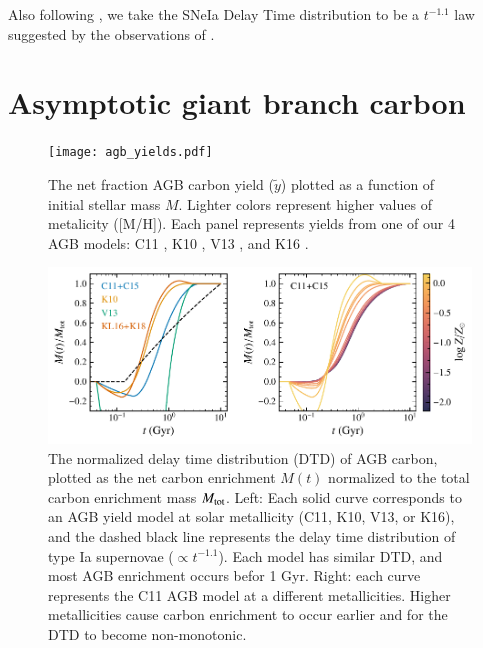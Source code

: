 \documentclass[12pt,oneside]{report}
\begin{document}
Also following \citet{james+21, james+22}, we take the SNeIa Delay Time distribution to be a
$t^{-1.1}$ law suggested by the observations of \citet{maoz+12}.


\section{Asymptotic giant branch carbon}\label{sec:agb}

\begin{figure}
    \centering
 	    \texttt{[image: agb\_yields.pdf]}\\

        \caption[AGB carbon yields]{The net fraction AGB carbon yield ($\tilde{y}$) plotted as a function of initial stellar mass $M$. Lighter colors represent higher values of metalicity ([M/H]). Each panel represents yields from one of our 4 AGB models: C11 \citep{cristallo+11, cristallo+15}, K10 \citep{karakas10}, V13 \citep{ventura+13,ventura+14,ventura+18}, and K16 \citep{KL16, karakas+18}.
        }
            \label{fig:y_agb}
\end{figure}

\begin{figure}
    \includegraphics[scale=1]{y_agb_t2.pdf}

    \caption[AGB yields delay time distribution]{
        The normalized delay time distribution (DTD) of AGB carbon, plotted as the net carbon enrichment $M(t)$ normalized to the total carbon enrichment mass $M_{\rm tot}$. Left: Each solid curve corresponds to an AGB yield model at solar metallicity (C11, K10, V13, or K16), and the dashed black line represents the delay time distribution of type Ia supernovae ($\propto t^{-1.1}$). Each model has similar DTD, and most AGB enrichment occurs befor 1 Gyr. Right: each curve represents the C11 AGB model at a different metallicities. Higher metallicities cause carbon enrichment to occur earlier and for the DTD to become non-monotonic.
    }

\end{figure}
\end{document}
